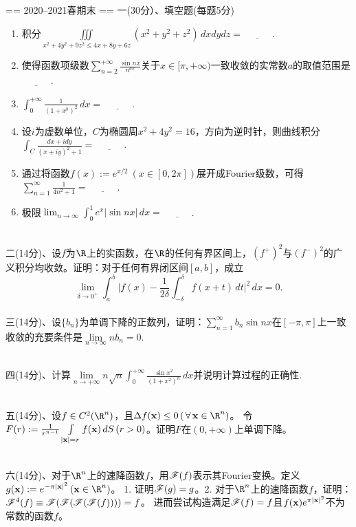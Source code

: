 == 2020--2021春期末 ==
一(30分）、填空题(每题5分)
\begin{enumerate}[label=(\arabic*)]
\item 积分$\displaystyle \iiint\limits_{x^2+4y^2+9z^2\leq4x+8y+6z}(x^2+y^2+z^2)\,dxdydz=\underline{\qquad\quad}$.\\
\item 使得函数项级数$\displaystyle \sum_{n=2}^{+\infty} \frac{\sin nx}{n^{ax}}$关于$x\in[\pi,+\infty)$一致收敛的实常数$a$的取值范围是$\underline{\qquad\quad}$.\\
\item $\displaystyle \int_0^{+\infty}\frac{1}{(1+x^8)^2}\,dx=\underline{\qquad\quad}$.\\
\item 设$i$为虚数单位，$C$为椭圆周$x^2+4y^2=16$，方向为逆时针，则曲线积分$\displaystyle \int_C\frac{dx+idy}{(x+iy)^2+1}=\underline{\qquad\quad}$.\\
\item 通过将函数$f(x):=e^{x/2}\ (x\in[0,2\pi])$展开成Fourier级数，可得$\displaystyle \sum_{n=1}^\infty\frac{1}{4n^2+1}=\underline{\qquad\quad}$.\\
\item 极限$\displaystyle \lim_{n\to\infty} \int_0^1e^x|\sin nx|\,dx=\underline{\qquad\quad}$.\\
\end{enumerate}
~\\
二(14分)、设$f$为$\R$上的实函数，在$\R$的任何有界区间上，$(f^+)^2$与$(f^-)^2$的广义积分均收敛。证明：对于任何有界闭区间$[a,b]$，成立
$$\lim_{\delta\to0^+}\int_a^b \Big|f(x)-\frac{1}{2\delta}\int_{-\delta}^\delta f(x+t)\,dt\Big|^2\,dx=0.$$
~\\
三(14分)、设$\{b_n\}$为单调下降的正数列，证明：$\displaystyle \sum_{n=1}^\infty b_n\sin nx$在$[-\pi,\pi]$上一致收敛的充要条件是$\lim\limits_{n\rightarrow\infty}nb_n=0$.

~\\
四(14分)、计算$\displaystyle \lim\limits_{n\to+\infty}n\sqrt{n}\int_0^{+\infty} \frac{\sin x^2}{(1+x^2)^n} \,dx$并说明计算过程的正确性.

~\\
五(14分)、设$f\in C^2(\R^n)$，且$\Delta f(\x)\le0\,(\,\forall\,\x\in\R^n)$。
令$F(r):=\frac{1}{r^{n-1}}\int\limits_{|\mathbf{x}|=r}f(\mathbf{x})\,dS\,(r>0)$。证明$F$在$(0,+\infty)$上单调下降。

~\\
六(14分)、对于$\R^n$上的速降函数$f$，用$\mathscr{F}(f)$表示其Fourier变换。定义$g(\x):=e^{-\pi|\x|^2}\,(\x\in\R^n)$。
1. 证明$\mathscr{F}(g)=g$。2. 对于$\R^n$上的速降函数$f$，证明：$\mathscr{F}^4(f)\equiv\mathscr{F}(\mathscr{F}(\mathscr{F}(\mathscr{F}(f))))=f$。
进而尝试构造满足$\mathscr{F}(f)=f$且$f(\mathbf{x})e^{\pi|\mathbf{x}|^2}$不为常数的函数$f$。